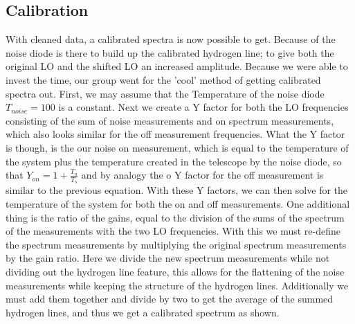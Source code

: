 \documentclass[12 pt]{article}
\begin{document}
\subsection*{Calibration}
With cleaned data, a calibrated spectra is now possible to get. Because
of the noise diode is there to build up the calibrated
hydrogen line; to give both the original LO and the shifted LO an
increased amplitude. Because we were able to invest the time, our group
went for the 'cool' method of getting calibrated spectra out. First, we
may assume that the Temperature of the noise diode $T_{noise} = 100$ is
a constant. Next we create a Y factor for both the LO frequencies
consisting of the sum of noise measurements and on spectrum
measurements, which also looks similar for the off measurement
frequencies. What the Y factor is though, is the our noise on
measurement, which is equal to the temperature of the system plus the
temperature created in the telescope by the noise diode, so that
$Y_{on}=1+\frac{T_n}{T_s}$ and by analogy the o Y factor for the off
measurement is similar to the previous equation. With these Y factors,
we can then solve for the temperature of the system for both the on and
off measurements. One additional thing is the ratio of the gains,  equal
to the division of the sums of the spectrum of the measurements with the
two LO frequencies. With this we must re-define the spectrum
measurements by multiplying the original spectrum measurements by the
gain ratio. Here we divide the new spectrum measurements while not
dividing out the hydrogen line feature, this allows for the flattening
of the noise measurements while keeping the structure of the hydrogen
lines. Additionally we must add them together and divide by two to get
the average of the summed hydrogen lines, and thus we get a calibrated
spectrum as shown. 
\end{document}
